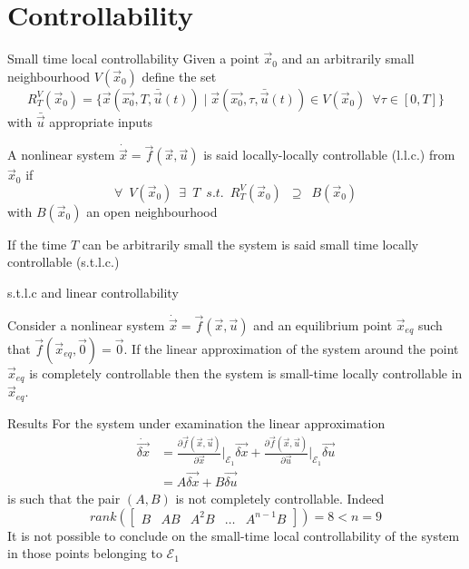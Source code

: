 \section{Controllability}

\begin{frame}{Small time local controllability}
  Given a point $\vec{x}_0$ and an arbitrarily small neighbourhood $V(\vec{x}_0)$ define the set
  \[
  R_{T}^{V}(\vec{x}_0) = \{\vec{x}(\vec{x_0}, T, \bar{\vec{u}}(t)) \mid
  \vec{x}(\vec{x_0}, \tau, \bar{\vec{u}}(t)) \in V(\vec{x}_0) \enspace \forall \tau \in [0,T]\}
  \]
  with $\bar{\vec{u}}$ appropriate inputs
  \par
  A nonlinear system $\dot{\vec{x}} = \vec{f}(\vec{x}, \vec{u})$ is said locally-locally controllable (l.l.c.) from $\vec{x}_0$ if
  \[
  \forall \enspace V(\vec{x}_0) \enspace \exists  \enspace T \enspace
  s.t. \enspace R_{T}^{V}(\vec{x}_0) \enspace \supseteq \enspace B(\vec{x}_0)
  \]
  with $B(\vec{x}_0)$ an open neighbourhood
  \par
  If the time $T$ can be arbitrarily small the system is said small time locally controllable (s.t.l.c.)
\end{frame}

\begin{frame}{s.t.l.c and linear controllability}
  \begin{theorem}
    Consider a nonlinear system $\dot{\vec{x}} = \vec{f}(\vec{x}, \vec{u})$ and an equilibrium point $\vec{x}_{eq}$
    such that $\vec{f}(\vec{x}_{eq}, \vec{0}) = \vec{0}$. If the linear approximation of the system around
    the point $\vec{x}_{eq}$ is completely controllable then the system is small-time locally controllable
    in $\vec{x}_{eq}$.
  \end{theorem}
\end{frame}

\begin{frame}{Results}
  For the system under examination the linear approximation
  \[
  \begin{split}
    \dot{\vec{\delta x}} &= \frac{\partial{\vec{f}(\vec{x},\vec{u})}}{\partial{\vec{x}}}\Big|_{\mathcal{E}_1} \vec{\delta x} +
    \frac{\partial{\vec{f}(\vec{x},\vec{u})}}{\partial{\vec{u}}}\Big|_{\mathcal{E}_1} \vec{\delta u}\\
    &= A \vec{\delta x} + B \vec{\delta u}
  \end{split}
  \]
  is such that the pair $(A, B)$ is not completely controllable. Indeed
  \[
  rank\left(
  \begin{bmatrix}
    B & AB & A^2B & \dots & A^{n-1}B
  \end{bmatrix}
  \right) = 8 < n = 9
  \]
  It is not possible to conclude on the small-time local controllability of the system
  in those points belonging to $\mathcal{E}_1$
\end{frame}

